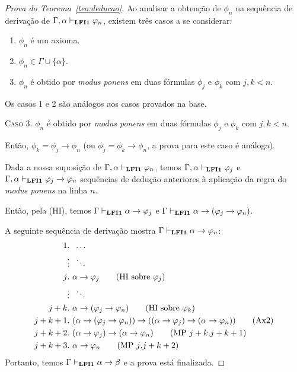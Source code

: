 \begin{proof}[Prova do Teorema~\ref{teo:deducao}]
            Ao analisar a obtenção de $\phi_{n}$ na sequência de derivação de $\Gamma, \alpha\vdash_{{\normalfont\textbf{LFI1}}{}} \varphi_{n}$, existem três casos a se considerar:
            \begin{enumerate}
                \item $\phi_{n}$ é um axioma.
                \item $\phi_{n} \in \Gamma \cup \{\alpha\}$.
                \item $\phi_{n}$ é obtido por \textit{modus ponens} em duas fórmulas $\phi_{j}$ e $\phi_{k}$ com $j, k < n$.
            \end{enumerate}
            
            Os casos 1 e 2 são análogos aos casos provados na base.

            \noindent \textsc{Caso 3.} $\phi_{n}$ é obtido por \textit{modus ponens} em duas fórmulas $\phi_{j}$ e $\phi_{k}$ com $j, k < n$. 
            
            Então, $\phi_{k} = \phi_{j} \to \phi_{n}$ (ou $\phi_{j} = \phi_{k} \to \phi_{n}$, a prova para este caso é análoga). 
            
            Dada a nossa suposição de $\Gamma, \alpha \vdash_{{\normalfont\textbf{LFI1}}{}} \varphi_{n}$, temos $\Gamma, \alpha \vdash_{{\normalfont\textbf{LFI1}}{}} \varphi_{j}$ e $\Gamma, \alpha \vdash_{{\normalfont\textbf{LFI1}}{}} \varphi_{j} \to \varphi_{n}$ sequências de dedução anteriores à aplicação da regra do \textit{modus ponens} na linha $n$. 
            
            Então, pela (HI), temos $\Gamma \vdash_{{\normalfont\textbf{LFI1}}{}} \alpha \to \varphi_{j}$ e $\Gamma \vdash_{{\normalfont\textbf{LFI1}}{}} \alpha \to (\varphi_{j} \to \varphi_{n})$. 
            
            A seguinte sequência de derivação mostra $\Gamma \vdash_{{\normalfont\textbf{LFI1}}{}} \alpha \to \varphi_{n}$:
            \begin{align*}
                \text{1}&.~ \; \ldots\\
                &\vdots \; ~\ddots\\
                \text{$j$}&.~ \alpha \to \phi_{j} \tag{HI sobre $\phi_{j}$}\\
                &\vdots \; ~\ddots\\
                \text{$j + k$}&.~ \alpha \to (\phi_{j} \to \phi_{n}) \tag{HI sobre $\phi_{k}$}\\
                \text{$j + k + 1$}&.~ (\alpha \to (\phi_{j} \to \phi_{n})) \to ((\alpha \to \phi_{j}) \to (\alpha \to \phi_{n})) \tag{Ax2}\\
                \text{$j + k + 2$}&.~ (\alpha \to \phi_{j}) \to (\alpha \to \phi_{n}) \tag{MP $j + k$\text{,}$j + k + 1$}\\
                \text{$j + k + 3$}&.~ \alpha \to \phi_{n} \tag{MP $j$\text{,}$j + k + 2$}
            \end{align*}
            Portanto, temos $\Gamma \vdash_{{\normalfont\textbf{LFI1}}{}} \alpha \to \beta$ e a prova está finalizada.
            
        \end{proof}


